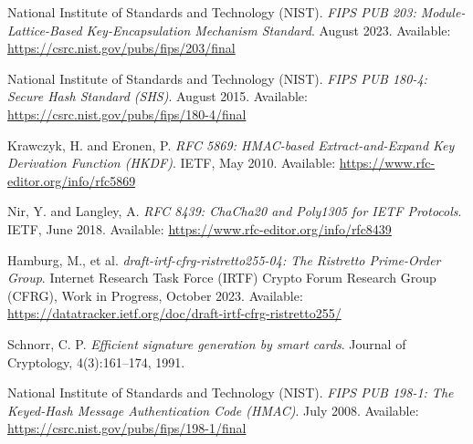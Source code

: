 \documentclass[11pt]{article}
\begin{document}
	\begin{thebibliography}{9} %
		
		National Institute of Standards and Technology (NIST).
		\textit{FIPS PUB 203: Module-Lattice-Based Key-Encapsulation Mechanism Standard}.
		August 2023.
		Available: \url{https://csrc.nist.gov/pubs/fips/203/final}
		
		National Institute of Standards and Technology (NIST).
		\textit{FIPS PUB 180-4: Secure Hash Standard (SHS)}.
		August 2015.
		Available: \url{https://csrc.nist.gov/pubs/fips/180-4/final}
		
		Krawczyk, H. and Eronen, P.
		\textit{RFC 5869: HMAC-based Extract-and-Expand Key Derivation Function (HKDF)}.
		IETF, May 2010.
		Available: \url{https://www.rfc-editor.org/info/rfc5869}
		
		Nir, Y. and Langley, A.
		\textit{RFC 8439: ChaCha20 and Poly1305 for IETF Protocols}.
		IETF, June 2018.
		Available: \url{https://www.rfc-editor.org/info/rfc8439}
		
		Hamburg, M., et al. %
		\textit{draft-irtf-cfrg-ristretto255-04: The Ristretto Prime-Order Group}.
		Internet Research Task Force (IRTF) Crypto Forum Research Group (CFRG), Work in Progress, October 2023. %
		Available: \url{https://datatracker.ietf.org/doc/draft-irtf-cfrg-ristretto255/}
		
		Schnorr, C. P.
		\textit{Efficient signature generation by smart cards}.
		Journal of Cryptology, 4(3):161–174, 1991.
		
		National Institute of Standards and Technology (NIST).
		\textit{FIPS PUB 198-1: The Keyed-Hash Message Authentication Code (HMAC)}.
		July 2008.
		Available: \url{https://csrc.nist.gov/pubs/fips/198-1/final}
		
	\end{thebibliography}
	
	
\end{document}
